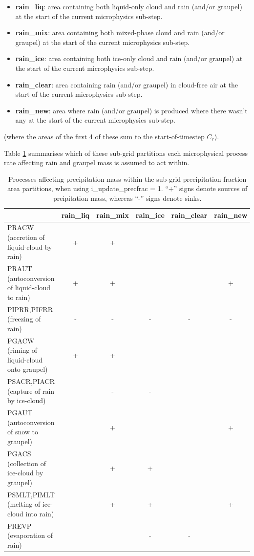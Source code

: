 \documentclass{UMDP_article}
\begin{document}
\begin{itemize}
\item {\bf rain\_liq}: area containing both liquid-only cloud and rain
(and/or graupel) at the start of the current microphysics sub-step.
\item {\bf rain\_mix}: area containing both mixed-phase cloud and rain
(and/or graupel) at the start of the current microphysics sub-step.
\item {\bf rain\_ice}: area containing both ice-only cloud and rain
(and/or graupel) at the start of the current microphysics sub-step.
\item {\bf rain\_clear}: area containing rain (and/or graupel) in cloud-free
air at the start of the current microphysics sub-step.
\item {\bf rain\_new}: area where rain (and/or graupel) is produced where
there wasn't any at the start of the current microphysics sub-step.
\end{itemize}

(where the areas of the first 4 of these sum to the start-of-timestep $C_r$).

Table \ref{tab:precfrac_processes} summarises which of these sub-grid
partitions each microphysical process rate affecting rain and graupel mass
is assumed to act within.

\begin{table}[ht!]
\begin{center}
\begin{tabular}{|p{4cm}|c|c|c|c|c|}
\hline
 &
{\bf rain\_liq} &
{\bf rain\_mix} &
{\bf rain\_ice} &
{\bf rain\_clear} &
{\bf rain\_new} \\
\hline
PRACW (accretion of liquid-cloud by rain)      & + & + &   &   &   \\
\hline
PRAUT (autoconversion of liquid-cloud to rain) & + & + &   &   & + \\
\hline
PIPRR,PIFRR (freezing of rain)                 & - & - & - & - & - \\
\hline
PGACW (riming of liquid-cloud onto graupel)    & + & + &   &   &   \\
\hline
PSACR,PIACR (capture of rain by ice-cloud)     &   & - & - &   &   \\
\hline
PGAUT (autoconversion of snow to graupel)      &   & + &   &   & + \\
\hline
PGACS (collection of ice-cloud by graupel)     &   & + & + &   &   \\
\hline
PSMLT,PIMLT (melting of ice-cloud into rain)   &   & + & + &   & + \\
\hline
PREVP (evaporation of rain)                    &   &   & - & - &   \\
\hline
\end{tabular}
\end{center}
\caption{Processes affecting precipitation mass within the sub-grid
precipitation fraction area partitions, when using i\_update\_precfrac = 1.
``+'' signs denote sources of preipitation mass,
whereas ``-'' signs denote sinks.}
\label{tab:precfrac_processes}
\end{table}
\end{document}
